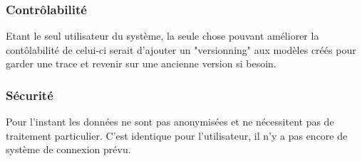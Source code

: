 \documentclass{polytech/polytech}
\numberwithin{figure}{chapter}
\begin{document}
\begin{appendix}
\subsubsection{Contrôlabilité}
Etant le seul utilisateur du système, la seule chose pouvant améliorer la contôlabilité de celui-ci serait d'ajouter un "versionning" aux modèles créés pour garder une trace et revenir sur une ancienne version si besoin.

\subsubsection{Sécurité}
Pour l'instant les données ne sont pas anonymisées et ne nécessitent pas de traitement particulier. C'est identique pour l'utilisateur, il n'y a pas encore de système de connexion prévu.                                                         

\end{appendix}
\end{document}
